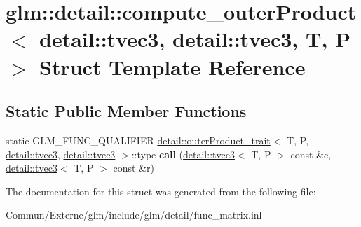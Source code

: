\hypertarget{structglm_1_1detail_1_1compute__outer_product_3_01detail_1_1tvec3_00_01detail_1_1tvec3_00_01_t_00_01_p_01_4}{}\section{glm\+:\+:detail\+:\+:compute\+\_\+outer\+Product$<$ detail\+:\+:tvec3, detail\+:\+:tvec3, T, P $>$ Struct Template Reference}
\label{structglm_1_1detail_1_1compute__outer_product_3_01detail_1_1tvec3_00_01detail_1_1tvec3_00_01_t_00_01_p_01_4}
\subsection*{Static Public Member Functions}
\begin{DoxyCompactItemize}
\item 
static G\+L\+M\+\_\+\+F\+U\+N\+C\+\_\+\+Q\+U\+A\+L\+I\+F\+I\+ER \hyperlink{structglm_1_1detail_1_1outer_product__trait}{detail\+::outer\+Product\+\_\+trait}$<$ T, P, \hyperlink{structglm_1_1detail_1_1tvec3}{detail\+::tvec3}, \hyperlink{structglm_1_1detail_1_1tvec3}{detail\+::tvec3} $>$\+::type {\bfseries call} (\hyperlink{structglm_1_1detail_1_1tvec3}{detail\+::tvec3}$<$ T, P $>$ const \&c, \hyperlink{structglm_1_1detail_1_1tvec3}{detail\+::tvec3}$<$ T, P $>$ const \&r)\hypertarget{structglm_1_1detail_1_1compute__outer_product_3_01detail_1_1tvec3_00_01detail_1_1tvec3_00_01_t_00_01_p_01_4_ab97eae3a1827791b1e9e3324ea454b2d}{}\label{structglm_1_1detail_1_1compute__outer_product_3_01detail_1_1tvec3_00_01detail_1_1tvec3_00_01_t_00_01_p_01_4_ab97eae3a1827791b1e9e3324ea454b2d}

\end{DoxyCompactItemize}


The documentation for this struct was generated from the following file\+:\begin{DoxyCompactItemize}
\item 
Commun/\+Externe/glm/include/glm/detail/func\+\_\+matrix.\+inl\end{DoxyCompactItemize}
